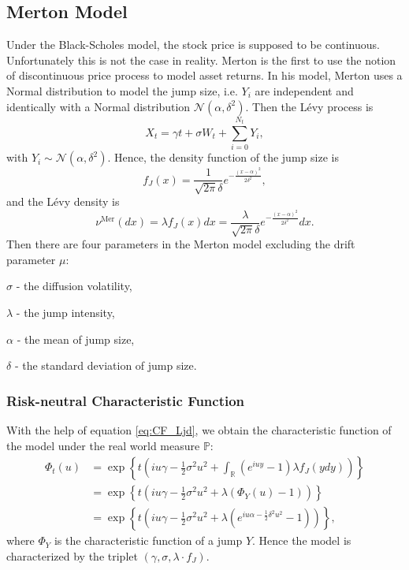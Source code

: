 \subsection{Merton Model}
Under the Black-Scholes model, the stock price is supposed to be continuous. Unfortunately this is not the case in reality. Merton \citeyearpar{Mer76} is the first to use the notion of discontinuous price process to model asset returns. In his model, Merton uses a Normal distribution to model the jump size, i.e. $Y_i$ are independent and identically with a Normal distribution $\mathcal{N}(\alpha,\delta^2)$. Then the L\'evy process is
$$X_t = \gamma t +\sigma W_t +\sum_{i=0}^{N_t} Y_i,$$
with $Y_i\sim \mathcal{N}(\alpha,\delta^2)$. Hence, the density function of the jump size is
$$f_J(x) = \frac{1}{\sqrt{2\pi}\delta}e^{-\frac{(x-\alpha)^2}{2\delta^2}},$$
and the L\'evy density is
$$\nu^\text{Mer}(dx) = \lambda f_J(x)dx = \frac{\lambda}{\sqrt{2\pi}\delta}e^{-\frac{(x-\alpha)^2}{2\delta^2}}dx.$$
Then there are four parameters in the Merton model excluding the drift parameter $\mu$:
\begin{my_list_item}
\item $\sigma$ - the diffusion volatility, 
\item $\lambda$ - the jump intensity,
\item $\alpha$ - the mean of jump size,
\item $\delta$ - the standard deviation of jump size.
\end{my_list_item}

\subsubsection*{Risk-neutral Characteristic Function}
With the help of equation \ref{eq:CF_Ljd}, we obtain the characteristic function of the model under the real world measure $\mathbb{P}$:
\begin{align*}
\Phi_t(u) &= \exp\left\{t\left(iu\gamma -\frac{1}{2}\sigma^2 u^2 + \int_\mathbb{R}\left(e^{iuy}-1\right)\lambda f_J(ydy)\right)\right\}\\
&= \exp\left\{t\left(iu\gamma - \frac{1}{2}\sigma^2 u^2 + \lambda\left( \Phi_Y(u)-1\right)\right)\right\}\\
&= \exp\left\{t\left(iu\gamma - \frac{1}{2}\sigma^2 u^2 + \lambda\left( e^{iu\alpha - \frac{1}{2}\delta^2 u^2}-1\right)\right)\right\},
\end{align*}
where $\Phi_Y$ is the characteristic function of a jump $Y$. Hence the model is characterized by the triplet $(\gamma,\sigma,\lambda \cdot f_J)$.

